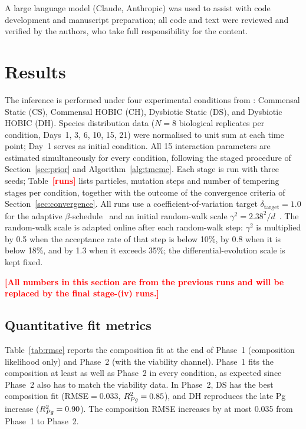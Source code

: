\documentclass[pdflatex,sn-mathphys-ay,lineno]{sn-jnl}%
\newcommand{\TBD}[1]{\textcolor{red}{\textbf{[#1]}}}
\begin{document}
A large language model (Claude, Anthropic) was used to assist with code development and manuscript preparation; all code and text were reviewed and verified by the authors, who take full responsibility for the content.

\section{Results}
\label{sec:results}

The inference is performed under four experimental conditions from \citet{heine2025influence}: Commensal Static (CS), Commensal HOBIC (CH), Dysbiotic Static (DS), and Dysbiotic HOBIC (DH).
Species distribution data ($N=8$ biological replicates per condition, Days~1, 3, 6, 10, 15, 21) were normalised to unit sum at each time point; Day~1 serves as initial condition.
All 15 interaction parameters are estimated simultaneously for every condition, following the staged procedure of Section~\ref{sec:prior} and Algorithm~\ref{alg:tmcmc}.
Each stage is run with three seeds; Table~\TBD{runs} lists particles, mutation steps and number of tempering stages per condition, together with the outcome of the convergence criteria of Section~\ref{sec:convergence}.
All runs use a coefficient-of-variation target $\delta_{\mathrm{target}}=1.0$ for the adaptive $\beta$-schedule~\citep{Betz2016TMCMC} and an initial random-walk scale $\gamma^2=2.38^2/d$~\citep{RobertsRosenthal2001Optimal}.
The random-walk scale is adapted online after each random-walk step: $\gamma^2$ is multiplied by 0.5 when the acceptance rate of that step is below 10\%, by 0.8 when it is below 18\%, and by 1.3 when it exceeds 35\%; the differential-evolution scale is kept fixed.

\TBD{All numbers in this section are from the previous runs and will be replaced by the final stage-(iv) runs.}

\subsection{Quantitative fit metrics}

Table~\ref{tab:rmse} reports the composition fit at the end of Phase~1 (composition likelihood only) and Phase~2 (with the viability channel).
Phase~1 fits the composition at least as well as Phase~2 in every condition, as expected since Phase~2 also has to match the viability data.
In Phase~2, DS has the best composition fit (RMSE$=$0.033, $R^2_{\text{\textit{Pg}}}=0.85$), and DH reproduces the late Pg increase ($R^2_{\text{\textit{Pg}}}=0.90$).
The composition RMSE increases by at most 0.035 from Phase~1 to Phase~2.
\end{document}
